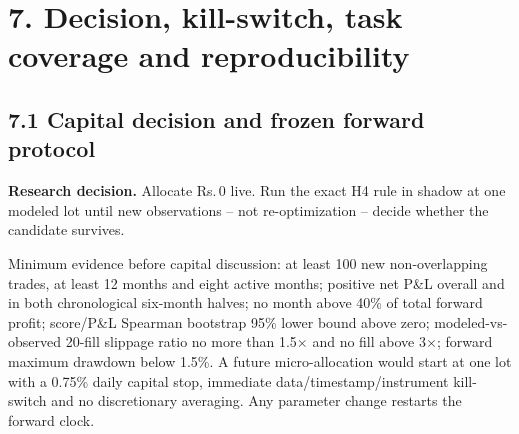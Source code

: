 \documentclass[10pt,a4paper]{article}
\newcommand{\INR}{\textsf{Rs.}\,}
\newcommand{\decisionbox}[1]{\colorbox{Pale}{\parbox{0.965\linewidth}{\textbf{Research decision.} #1}}}
\begin{document}
\newpage
\section*{7. Decision, kill-switch, task coverage and reproducibility}
\subsection*{7.1 Capital decision and frozen forward protocol}
\decisionbox{Allocate \INR0 live. Run the exact H4 rule in shadow at one modeled lot until new observations -- not re-optimization -- decide whether the candidate survives.}

Minimum evidence before capital discussion: at least 100 new non-overlapping trades, at least 12 months and eight active months; positive net P\&L overall and in both chronological six-month halves; no month above 40\% of total forward profit; score/P\&L Spearman bootstrap 95\% lower bound above zero; modeled-vs-observed 20-fill slippage ratio no more than 1.5$\times$ and no fill above 3$\times$; forward maximum drawdown below 1.5\%. A future micro-allocation would start at one lot with a 0.75\% daily capital stop, immediate data/timestamp/instrument kill-switch and no discretionary averaging. Any parameter change restarts the forward clock.
\end{document}
